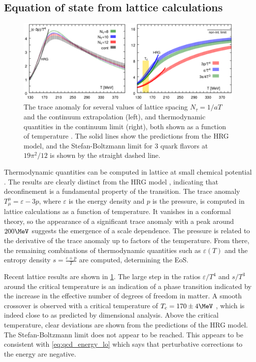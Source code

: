 \subsection{Equation of state from lattice calculations}
\label{subsec:lattice}

\begin{figure}[t]
  \includegraphics[width=\linewidth]{lattice_eos.png}
  \caption{The trace anomaly for several values of lattice spacing $N_\tau = 1/aT$ and the continuum extrapolation (left), and thermodynamic quantities in the continuum limit (right), both shown as a function of temperature \cite{Bazavov:2014pvz}. The solid lines show the predictions from the HRG model, and the Stefan-Boltzmann limit for 3 quark flavors at $19\pi^2/12$ is shown by the straight dashed line.}
  \label{fig:lattice_eos}
\end{figure}

Thermodynamic quantities can be computed in lattice \qcd at small chemical potential \cite{Borsanyi:2013bia,Bazavov:2014pvz}.
The results are clearly distinct from the \ac{HRG} model \cite{Huovinen:2009yb}, indicating that deconfinement is a fundamental property of the transition.
The trace anomaly $T_\mu^\mu = \varepsilon - 3 p$, where $\varepsilon$ is the energy density and $p$ is the pressure, is computed in lattice calculations as a function of temperature.
It vanishes in a conformal theory, so the appearance of a significant trace anomaly with a peak around $200 \MeV$ suggests the emergence of a scale dependence.
The pressure is related to the derivative of the trace anomaly up to factors of the temperature.
From there, the remaining combinations of thermodynamic quantities such as $\varepsilon(T)$ and the entropy density $s = \frac{\varepsilon + p}{T}$ are computed, determining the \ac{EoS}.

Recent lattice \qcd results are shown in \cref{fig:lattice_eos}.
The large step in the ratios $\varepsilon/T^4$ and $s/T^3$ around the critical temperature is an indication of a phase transition indicated by the increase in the effective number of degrees of freedom in \qcd matter.
A smooth crossover is observed with a critical temperature of \( T_c = 170 \pm 4 \MeV \) \cite{Aoki:2009sc}, which is indeed close to \lqcd as predicted by dimensional analysis.
Above the critical temperature, clear deviations are shown from the predictions of the \ac{HRG} model.
The Stefan-Boltzmann limit does not appear to be reached.
This appears to be consistent with \cref{eq:qcd_energy_lo} which says that perturbative corrections to the energy are negative.


